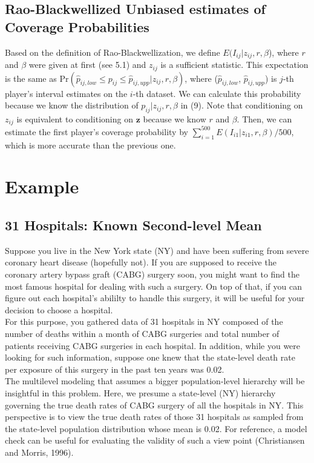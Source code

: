 \documentclass[article]{jss}
\begin{document}
\subsection{Rao-Blackwellized Unbiased estimates of Coverage Probabilities}
Based on the definition of Rao-Blackwellization, we define $E(I_{ij}\vert z_{ij}, r, \beta$), where $r$ and $\beta$ were given at first (see 5.1) and $z_{ij}$ is a sufficient statistic. This expectation is the same as Pr$(\hat{p}_{ij, low}\le p_{ij} \le\hat{p}_{ij, upp}\vert z_{ij}, r, \beta)$, where ($\hat{p}_{ij, low}$, $\hat{p}_{ij, upp}$) is $j$-th player's interval estimates on the $i$-th dataset. We can calculate this probability  because we know the distribution of $p_{ij} \vert z_{ij}, r, \beta$ in (9). Note that conditioning on $z_{ij}$ is equivalent to conditioning on $\mathbf{z}$ because we know $r$ and $\beta$. Then, we can estimate the first player's coverage probability by $\sum_{i=1}^{500}E(I_{i1}\vert z_{i1}, r, \beta)/500$, which is more accurate than the previous one.

\section[Example]{Example}
\subsection[Known Second-level Mean]{31 Hospitals: Known Second-level Mean}
Suppose you live in the New York state (NY) and have been suffering from severe coronary heart disease (hopefully not). If you are supposed to receive the coronary artery bypass graft (CABG) surgery soon, you might want to find the most famous hospital for dealing with such a surgery. On top of that, if you can figure out each hospital's abililty to handle this surgery, it will be useful for your decision to choose a hospital.
\\

For this purpose, you gathered data of 31 hospitals in NY composed of the number of deaths within a month of CABG surgeries and total number of patients receiving CABG surgeries in each hospital. In addition, while you were looking for such information, suppose one knew that the state-level death rate per exposure of this surgery in the past ten years was 0.02. 
\\

The multilevel modeling that assumes a bigger population-level hierarchy will be insightful in this problem. Here, we presume a state-level (NY) hierarchy governing the true death rates of CABG surgery of all the hospitals in NY. This perspective is to view the true death rates of those 31 hospitals as sampled from the state-level population distribution whose mean is 0.02. For reference, a model check can be useful for evaluating the validity of such a view point (Christiansen and Morris, 1996). 
\\
\end{document}
